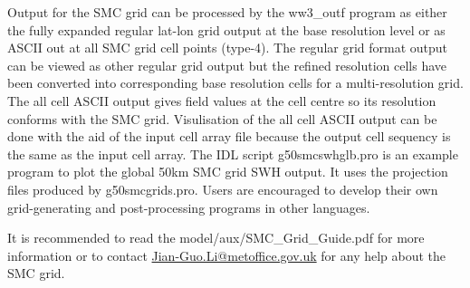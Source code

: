 Output for the SMC grid can be processed by the ww3\_outf program
as either the fully expanded regular lat-lon grid output at the base
resolution level or as ASCII out at all SMC grid cell points (type-4).
The regular grid format output can be viewed as other regular grid
output but the refined resolution cells have been converted into 
corresponding base resolution cells for a multi-resolution grid. 
The all cell ASCII output gives field values at the cell centre
so its resolution conforms with the SMC grid. Visulisation of the
all cell ASCII output can be done with the aid of the input cell array
file because the output cell sequency is the same as the input cell
array. The IDL script g50smcswhglb.pro is an example program to plot
the global 50km SMC grid SWH output. It uses the projection files
produced by g50smcgrids.pro. Users are encouraged to develop their
own grid-generating and post-processing programs in other languages.

It is recommended to read the model/aux/SMC\_Grid\_Guide.pdf for
more information or to contact \url{Jian-Guo.Li@metoffice.gov.uk} 
for any help about the SMC grid.

